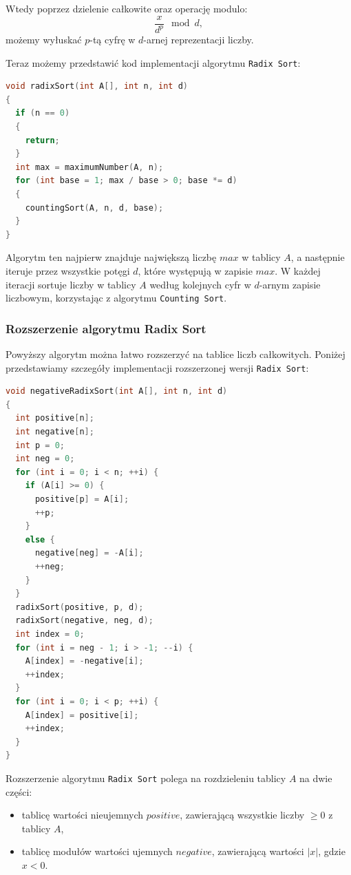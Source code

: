 \documentclass{article}
\begin{document}
Wtedy poprzez dzielenie całkowite oraz operację modulo:
\[
    \frac{x}{d^p} \mod d,
\]
możemy wyłuskać $p$-tą cyfrę w $d$-arnej reprezentacji liczby.

Teraz możemy przedstawić kod implementacji algorytmu \texttt{Radix Sort}:
\begin{lstlisting}[style=mystyle, language=C++, caption={Implementacja \texttt{Radix Sort}}, label={lst:radixsort}]
void radixSort(int A[], int n, int d)
{
  if (n == 0)
  {
    return;
  }
  int max = maximumNumber(A, n);
  for (int base = 1; max / base > 0; base *= d)
  {
    countingSort(A, n, d, base);
  }
}
\end{lstlisting}
Algorytm ten najpierw znajduje największą liczbę $max$ w tablicy $A$, a następnie iteruje przez wszystkie potęgi $d$, które występują w zapisie $max$. W każdej iteracji sortuje liczby w tablicy $A$ według kolejnych cyfr w $d$-arnym zapisie liczbowym, korzystając z algorytmu \texttt{Counting Sort}.
\subsubsection{Rozszerzenie algorytmu Radix Sort}
Powyższy algorytm można łatwo rozszerzyć na tablice liczb całkowitych. Poniżej przedstawiamy szczegóły implementacji rozszerzonej wersji \texttt{Radix Sort}:
\newpage
\begin{lstlisting}[style=mystyle, language=C++, caption={Implementacja rozszerzonej wersji \texttt{Radix Sort}}, label={lst:radixsort2}]
void negativeRadixSort(int A[], int n, int d)
{
  int positive[n];
  int negative[n];
  int p = 0;
  int neg = 0;
  for (int i = 0; i < n; ++i) {
    if (A[i] >= 0) {
      positive[p] = A[i];
      ++p;
    }
    else {
      negative[neg] = -A[i];
      ++neg;
    }
  }
  radixSort(positive, p, d);
  radixSort(negative, neg, d);
  int index = 0;
  for (int i = neg - 1; i > -1; --i) {
    A[index] = -negative[i];
    ++index;
  }
  for (int i = 0; i < p; ++i) {
    A[index] = positive[i];
    ++index;
  }
}
\end{lstlisting}

Rozszerzenie algorytmu \texttt{Radix Sort} polega na rozdzieleniu tablicy $A$ na dwie części:
\begin{itemize}
    \item tablicę wartości nieujemnych $positive$, zawierającą wszystkie liczby $\geq 0$ z tablicy $A$,
    \item tablicę modułów wartości ujemnych $negative$, zawierającą wartości $|x|$, gdzie $x < 0$.
\end{itemize}
\end{document}
